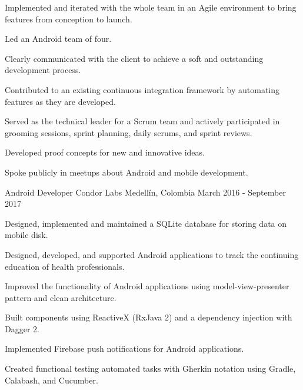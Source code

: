 \begin{cventries}
{\begin{cvitems}
        \item {Implemented and iterated with the whole team in an Agile environment to bring features from conception to launch.}
        \item {Led an Android team of four.}
        \item {Clearly communicated with the client to achieve a soft and outstanding development process.}
        \item {Contributed to an existing continuous integration framework by automating features as they are developed.}
        \item {Served as the technical leader for a Scrum team and actively participated in grooming sessions, sprint planning, daily scrums, and sprint reviews.}
        \item {Developed proof concepts for new and innovative ideas.}
        \item {Spoke publicly in meetups about Android and mobile development.}
      \end{cvitems}
      \begin{cvsubentries}
      \end{cvsubentries}
    }
  \cventry
    {Android Developer}
    {Condor Labs}
    {Medellín, Colombia}
    {March 2016 - September 2017}
    {
      \begin{cvitems}
        \item {Designed, implemented and maintained a SQLite database for storing data on mobile disk.}
        \item {Designed, developed, and supported Android applications to track the continuing education of health professionals.}
        \item {Improved the functionality of Android applications using model-view-presenter pattern and clean architecture.}
        \item {Built components using ReactiveX (RxJava 2) and a dependency injection with Dagger 2.}
        \item {Implemented Firebase push notifications for Android applications.}
        \item {Created functional testing automated tasks with Gherkin notation using Gradle, Calabash, and Cucumber.}

\end{cvitems}}
\end{cventries}
